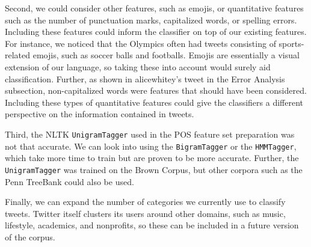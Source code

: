 \documentclass[twocolumn]{article}
\begin{document}
Second, we could consider other features, such as emojis, or quantitative features such as the number of punctuation marks, capitalized words, or spelling errors. Including these features could inform the classifier on top of our existing features. For instance, we noticed that the Olympics often had tweets consisting of sports-related emojis, such as soccer balls and footballs. Emojis are essentially a visual extension of our language, so taking these into account would surely aid classification. Further, as shown in alicewhitey’s tweet in the Error Analysis subsection, non-capitalized words were features that should have been considered. Including these types of quantitative features could give the classifiers a different perspective on the information contained in tweets.

Third, the NLTK \texttt{UnigramTagger} used in the POS feature set preparation was not that accurate. We can look into using the \texttt{BigramTagger} or the \texttt{HMMTagger}, which take more time to train but are proven to be more accurate. Further, the \texttt{UnigramTagger} was trained on the Brown Corpus, but other corpora such as the Penn TreeBank could also be used.

Finally, we can expand the number of categories we currently use to classify tweets. Twitter itself clusters its users around other domains, such as music, lifestyle, academics, and nonprofits, so these can be included in a future version of the corpus.

\printbibliography
\end{document}
